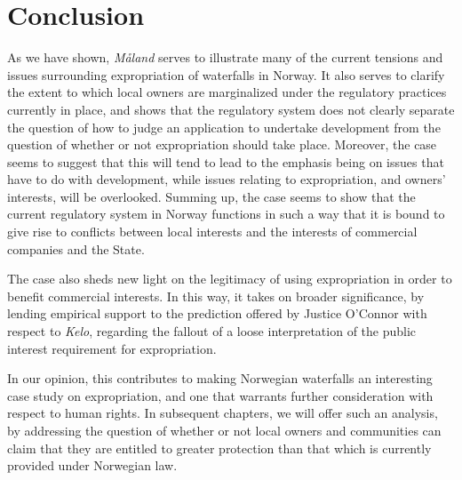 \section{Conclusion}\label{conc}

As we have shown, \emph{Måland} serves to illustrate many of the current tensions and issues surrounding expropriation of waterfalls in Norway. It also serves to clarify the extent to which local owners are 
marginalized under the regulatory practices currently in place, and shows that the regulatory system does not clearly separate the question of how to judge an application to undertake development from the question of whether or not expropriation should take place. Moreover, the case seems to suggest that this will tend to lead to the emphasis being on issues that have to do with development, while issues relating to expropriation, and owners' interests, will be overlooked. Summing up, the case seems to show that the current regulatory system in Norway functions in such a way that it is bound to give rise to conflicts between local interests and the interests of commercial companies and the State.

The case also sheds new light on the legitimacy of using expropriation in order to benefit commercial interests. In this way, it takes on broader significance, by lending empirical support to the prediction offered by Justice O'Connor with respect to \emph{Kelo}, regarding the fallout of a loose interpretation of the public interest requirement for expropriation.

In our opinion, this contributes to making Norwegian waterfalls an interesting case study on expropriation,  and one that warrants further consideration with respect to human rights. In subsequent chapters, we will offer such an analysis, by addressing the question of whether or not local owners and communities can claim that they are entitled to greater protection than that which is currently provided under Norwegian law.

